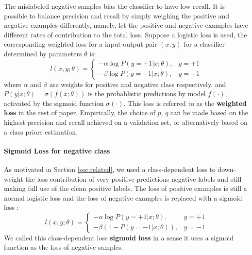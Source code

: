 The mislabeled negative samples bias the classifier to have low recall.
It is possible to balance precision and recall by simply weighing the positive and negative examples differently, namely, let the positive and negative examples have different rates of contribution to the total loss.
Suppose a logistic loss is used, the corresponding weighted loss for a input-output pair $(x, y)$ for a classifier determined by parameters $\theta$ is:
\[
  l(x, y; \theta) =
    \begin{cases}
      - \alpha \log P(y=+1 \vert x; \theta), & y = +1 \\
      - \beta \log P(y=-1 \vert x; \theta), & y = -1
    \end{cases}
\]
where $\alpha$ and $\beta$ are weights for positive and negative class respectively, and $P(y\vert x; \theta)=\sigma(f(x; \theta))$ is the probablistic predictions by model $f(\cdot)$, activated by the sigmoid function $\sigma(\cdot)$.
This loss is referred to as the \textbf{weighted loss} in the rest of paper.
Empirically, the choice of $p$, $q$ can be made based on the highest precision and recall achieved on a validation set, or alternatively based on a class priors estimation\cite{du2014class}.



\paragraph{Sigmoid Loss for negative class}

As motivated in Section \ref{sec:related}, we used a class-dependent loss to down-weight the loss contribution of very positive predictions negative labels and still making full use of the clean positive labels.
The loss of positive examples is still a normal logistic loss and the loss of negative examples is replaced with a sigmoid loss \cite{tax2016class}:
\[
  l(x, y; \theta) =
    \begin{cases}
      - \alpha \log P(y=+1 \vert x; \theta), & y = +1 \\
      - \beta (1 - P(y=-1 \vert x; \theta)), & y = -1
    \end{cases}
\]
We called this class-dependent loss \textbf{sigmoid loss} in a sense it uses a sigmoid function as the loss of negative samples.

